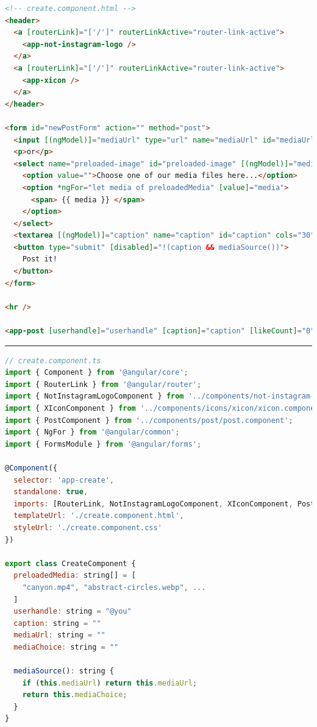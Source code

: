 \documentclass[a4paper, 12pt]{article}
\begin{document}
\begin{lstlisting}[caption=Create page in Angular (Template), label={lst:Angular:Create:Template}, language=HTML]
<!-- create.component.html -->
<header>
  <a [routerLink]="['/']" routerLinkActive="router-link-active">
    <app-not-instagram-logo />
  </a>
  <a [routerLink]="['/']" routerLinkActive="router-link-active">
    <app-xicon />
  </a>
</header>

<form id="newPostForm" action="" method="post">
  <input [(ngModel)]="mediaUrl" type="url" name="mediaUrl" id="mediaUrl" placeholder="Insert your media URL here..." />
  <p>or</p>
  <select name="preloaded-image" id="preloaded-image" [(ngModel)]="mediaChoice">
    <option value="">Choose one of our media files here...</option>
    <option *ngFor="let media of preloadedMedia" [value]="media">
      <span> {{ media }} </span>
    </option>
  </select>
  <textarea [(ngModel)]="caption" name="caption" id="caption" cols="30" rows="3" placeholder="Type your caption here" />
  <button type="submit" [disabled]="!(caption && mediaSource())">
    Post it!
  </button>
</form>

<hr />

<app-post [userhandle]="userhandle" [caption]="caption" [likeCount]="0" [mediaSource]="mediaUrl || mediaChoice" [hideActionIcons]="true" />
\end{lstlisting}

\vspace{0.5cm} \hrule \vspace{0.5cm}

\begin{lstlisting}[caption=Create page in Angular (Module), label={lst:Angular:Create:Module}, language=JavaScript]
// create.component.ts
import { Component } from '@angular/core';
import { RouterLink } from '@angular/router';
import { NotInstagramLogoComponent } from '../components/not-instagram-logo/not-instagram-logo.component';
import { XIconComponent } from '../components/icons/xicon/xicon.component';
import { PostComponent } from '../components/post/post.component';
import { NgFor } from '@angular/common';
import { FormsModule } from '@angular/forms';
  
@Component({
  selector: 'app-create',
  standalone: true,
  imports: [RouterLink, NotInstagramLogoComponent, XIconComponent, PostComponent, NgFor, FormsModule],
  templateUrl: './create.component.html',
  styleUrl: './create.component.css'
})

export class CreateComponent {
  preloadedMedia: string[] = [
    "canyon.mp4", "abstract-circles.webp", ...
  ]
  userhandle: string = "@you"
  caption: string = ""
  mediaUrl: string = ""
  mediaChoice: string = ""

  mediaSource(): string {
    if (this.mediaUrl) return this.mediaUrl;
    return this.mediaChoice;
  }
}
\end{lstlisting}
\end{document}
